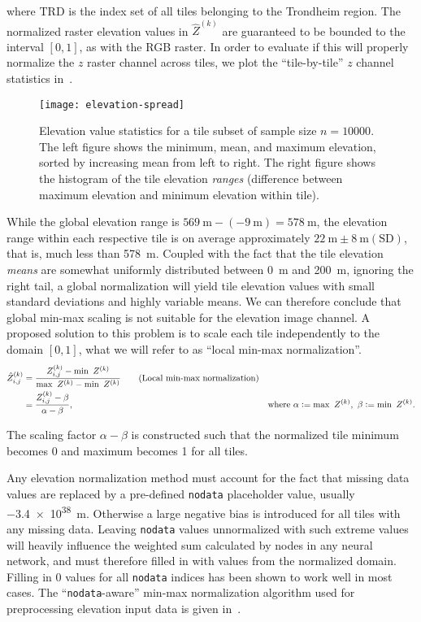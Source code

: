 where $\mathrm{TRD}$ is the index set of all tiles belonging to the Trondheim region.
The normalized raster elevation values in $\hat{Z}^{(k)}$ are guaranteed to be bounded to the interval $[0, 1]$, as with the RGB raster.
In order to evaluate if this will properly normalize the $z$ raster channel across tiles, we plot the \enquote{tile-by-tile} $z$ channel statistics in~.

\begin{figure}[H]
  \centering
  \texttt{[image: elevation-spread]}
  \caption{%
    Elevation value statistics for a tile subset of sample size $n = \num{10000}$.
    The left figure shows the minimum, mean, and maximum elevation, sorted by increasing mean from left to right.
    The right figure shows the histogram of the tile elevation \textit{ranges} (difference between maximum elevation and minimum elevation within tile).
  }%
  \label{fig:elevation-spread}
\end{figure}

While the global elevation range is $\SI{569}{\meter} - (\SI{-9}{\meter}) = \SI{578}{\meter}$, the elevation range within each respective tile is on average approximately $\SI{22}{\meter} \pm \SI{8}{\meter} (\mathrm{SD})$, that is, much less than \SI{578}{\meter}.
Coupled with the fact that the tile elevation \textit{means} are somewhat uniformly distributed between \SI{0}{\meter} and \SI{200}{\meter}, ignoring the right tail, a global normalization will yield tile elevation values with small standard deviations and highly variable means.
We can therefore conclude that global min-max scaling is not suitable for the elevation image channel.
A proposed solution to this problem is to scale each tile independently to the domain $[0, 1]$, what we will refer to as \enquote{local min-max normalization}.
%
\begin{align*}
  \hat{Z}_{i,j}^{(k)}
  &=
  \frac{%
    Z_{i,j}^{(k)} - \min~Z^{(k)}
  }{%
    \max~Z^{(k)} - \min~Z^{(k)}
  }%
  \tag{Local min-max normalization} %
  \\
  &=
  \frac{%
    Z_{i,j}^{(k)} - \beta
  }{%
    \alpha - \beta
  },%
  &\text{where }\alpha \defeq \max~Z^{(k)},~\beta \defeq \min~Z^{(k)}.
\end{align*}

The scaling factor $\alpha - \beta$ is constructed such that the normalized tile minimum becomes 0 and maximum becomes 1 for all tiles.

Any elevation normalization method must account for the fact that missing data values are replaced by a pre-defined \texttt{nodata} placeholder value, usually \SI{-3.4e38}{\meter}.
Otherwise a large negative bias is introduced for all tiles with any missing data.
Leaving \texttt{nodata} values unnormalized with such extreme values will heavily influence the weighted sum calculated by nodes in any neural network, and must therefore filled in with values from the normalized domain.
Filling in $0$ values for all \texttt{nodata} indices has been shown to work well in most cases.
The \enquote{\texttt{nodata}-aware} min-max normalization algorithm used for preprocessing elevation input data is given in~.

